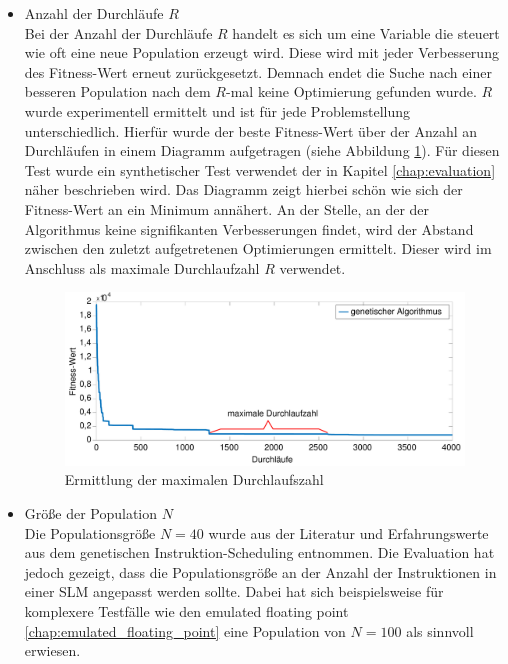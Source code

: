 \begin{itemize}
	\item Anzahl der Durchläufe $R$\\
		Bei der Anzahl der Durchläufe $R$ handelt es sich um eine Variable die steuert wie oft eine neue Population erzeugt wird. Diese wird mit jeder Verbesserung des Fitness-Wert erneut zurückgesetzt. Demnach endet die Suche nach einer besseren Population nach dem $R$-mal keine Optimierung gefunden wurde.
		$R$ wurde experimentell ermittelt und ist für jede Problemstellung unterschiedlich. Hierfür wurde der beste Fitness-Wert über der Anzahl an Durchläufen in einem Diagramm aufgetragen (siehe Abbildung \ref{fig:iteration_analyse}). Für diesen Test wurde ein synthetischer Test verwendet der in Kapitel \ref{chap:evaluation} näher beschrieben wird. Das Diagramm zeigt hierbei schön wie sich der Fitness-Wert an ein Minimum annähert. An der Stelle, an der der Algorithmus keine signifikanten Verbesserungen findet, wird der Abstand zwischen den zuletzt aufgetretenen Optimierungen ermittelt. Dieser wird im Anschluss als maximale Durchlaufzahl $R$ verwendet.
		
		\begin{figure}[H]
			\centering
			\includegraphics[width=\textwidth]{fig/iteration_analyse.pdf}
			\caption{Ermittlung der maximalen Durchlaufszahl}
			\label{fig:iteration_analyse}
		\end{figure}
	
	\item Größe der Population $N$\\
		Die Populationsgröße $N = 40$ wurde aus der Literatur \cite{grefenstette1986optimization} und Erfahrungswerte aus dem genetischen Instruktion-Scheduling entnommen. Die Evaluation hat jedoch gezeigt, dass die Populationsgröße an der Anzahl der Instruktionen in einer SLM angepasst werden sollte. Dabei hat sich beispielsweise für komplexere Testfälle wie den emulated floating point \ref{chap:emulated_floating_point} eine Population von $N = 100$ als sinnvoll erwiesen.
	

\end{itemize}
